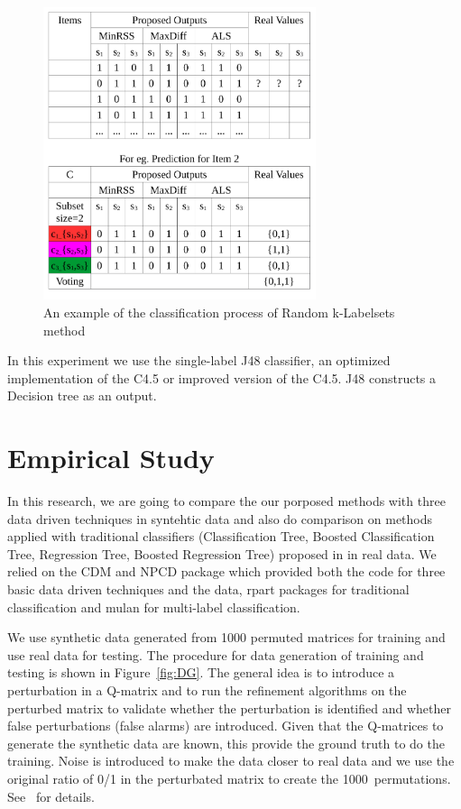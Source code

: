 \documentclass[11pt]{article}
\begin{document}
\begin{figure}[h]
  \centering
    \includegraphics[width=8cm]{graph/RAKEL.pdf}
  \caption{An example of the classification process of Random k-Labelsets method}\label{fig:RAKEL}
\end{figure}

In this experiment we use the single-label J48 classifier, an optimized  implementation of the  C4.5 or improved version of the  C4.5. J48 constructs a Decision tree as an output.  






\section{Empirical Study}

 In this research, we are going to compare the our porposed methods with three data driven techniques\cite{chiu2013statistical,de2008empirically,de2009dina,desmarais2013matrix} in syntehtic data and also do comparison on methods applied with traditional classifiers (Classification Tree, Boosted Classification Tree, Regression Tree, Boosted Regression Tree) proposed in\cite{desmarais2015combining} in real data. We relied on the CDM \cite{CDM} and NPCD package which provided both the code for three basic data driven techniques and the data, rpart packages for traditional classification and mulan \cite{Tsoumakas2010MLD} for multi-label classification. 
  
 We use synthetic data generated from 1000 permuted matrices for training  and use real data for testing. The procedure for data generation of training and testing is shown in Figure~\ref{fig:DG}. The general idea is to introduce a perturbation in a Q-matrix and to run the refinement algorithms on the perturbed matrix to validate whether the perturbation is identified and whether false perturbations (false alarms) are introduced. Given that the Q-matrices to generate the synthetic data are known, this provide the ground truth to do the training.  Noise is introduced to make the data closer to real data and we use the original ratio of 0/1 in the perturbated matrix to create the 1000~permutations.  See~\cite{desmarais2015combining} for details.
\end{document}
